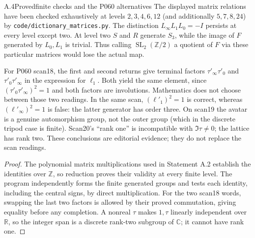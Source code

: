 \begin{claim}{A.4}{Proved}{finite checks and the P060 alternatives}
The displayed matrix relations have been checked exhaustively at levels $2,3,4,6,12$ (and additionally $5,7,8,24$) by \texttt{code/dictionary\_matrices.py}. The distinction $L_\infty L_1L_0=-I$ persists at every level except two. At level two $S$ and $R$ generate $S_3$, while the image of $F$ generated by $L_0,L_1$ is trivial. Thus calling $\operatorname{SL}_2(\mathbb Z/2)$ a quotient of $F$ via these particular matrices would lose the actual map.

For P060 scan18, the first and second returns give terminal factors $\tau'_\infty\tau'_0$ and $\tau'_0\tau'_\infty$ in the expression for $\ell_1$. Both yield the same element, since $(\tau'_0\tau'_\infty)^2=1$ and both factors are involutions. Mathematics does not choose between those two readings. In the same scan, $(\ell'_1)^2=1$ is correct, whereas $(\ell'_\infty)^2=1$ is false: the latter generator has order three. On scan19 the avatar is a genuine automorphism group, not the outer group (which in the discrete tripod case is finite). Scan20's ``rank one'' is incompatible with $\Im\tau\ne0$; the lattice has rank two. These conclusions are editorial evidence; they do not replace the scan readings.

\end{claim}

\begin{proof}
The polynomial matrix multiplications used in Statement A.2 establish the identities over $\mathbb Z$, so reduction proves their validity at every finite level. The program independently forms the finite generated groups and tests each identity, including the central signs, by direct multiplication. For the two scan18 words, swapping the last two factors is allowed by their proved commutation, giving equality before any completion. A nonreal $\tau$ makes $1,\tau$ linearly independent over $\mathbb R$, so the integer span is a discrete rank-two subgroup of $\mathbb C$; it cannot have rank one.
\end{proof}

